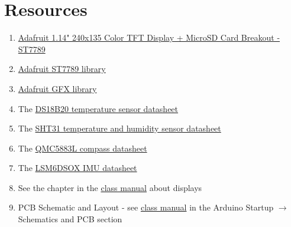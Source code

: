 \section{Resources}\label{sec:datacollectionsresources}
\begin{enumerate}
    \item \href{https://www.adafruit.com/product/4383}{Adafruit 1.14" 240x135 Color TFT Display + MicroSD Card Breakout - ST7789}
    \item \href{https://www.arduino.cc/reference/en/libraries/adafruit-st7735-and-st7789-library/}{Adafruit ST7789 library}
    \item \href{https://learn.adafruit.com/adafruit-gfx-graphics-library}{Adafruit GFX library}
    \item The \href{https://cdn-shop.adafruit.com/datasheets/DS18B20.pdf}{DS18B20 temperature sensor datasheet}
    \item The \href{https://sensirion.com/products/catalog/SHT31-DIS-B/}{SHT31 temperature and humidity sensor datasheet}
    \item The \href{https://www.filipeflop.com/img/files/download/Datasheet-QMC5883L-1.0%20.pdf}{QMC5883L compass datasheet}
    \item The \href{https://www.st.com/resource/en/datasheet/lsm6dsox.pdf}{LSM6DSOX IMU datasheet}    \item See the chapter in the \href{https://github.com/semcneil/Fundamentals-of-Microcontrollers-Manual}{class manual} about displays
    \item PCB Schematic and Layout - see 
            \href{https://github.com/semcneil/Fundamentals-of-Microcontrollers-Manual}{class manual} 
            in the Arduino Startup $\rightarrow$ Schematics and PCB section
\end{enumerate}

